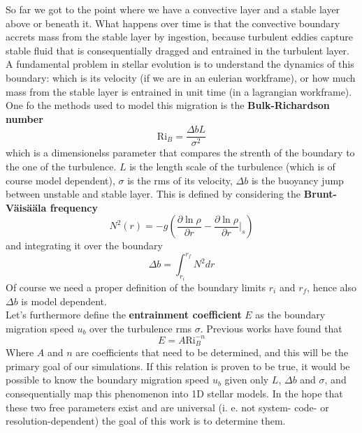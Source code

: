 \documentclass[11pt]{article}
\begin{document}
So far we got to the point where we have a convective layer and a stable layer above or beneath it. What happens over time is that the convective boundary accrets mass from the stable layer by ingestion, because turbulent eddies capture stable fluid that is consequentially dragged and entrained in the turbulent layer. A fundamental problem in stellar evolution is to understand the dynamics of this boundary: which is its velocity (if we are in an eulerian workframe), or how much mass from the stable layer is entrained in unit time (in a lagrangian workframe).\\
One fo the methods used to model this migration is the \textbf{Bulk-Richardson number}
\begin{equation}\label{bulkrichardson}
	\mathrm{Ri}_{B}=\frac{\Delta b L}{\sigma^2}
\end{equation}
which is a dimensionelss parameter that compares the strenth of the boundary to the one of the turbulence. $L$ is the length scale of the turbulence (which is of course model dependent), $\sigma$ is the rms of its velocity, $\Delta b$ is the buoyancy jump between unstable and stable layer. This is defined by considering the \textbf{Brunt-Väisääla frequency} 
\begin{equation}
	N^2(r)=-g \left (  \frac{\partial \ln \rho}{\partial r} -  \frac{\partial \ln \rho}{\partial r} \Big|_{s}  \right )
\end{equation}
and integrating it over the boundary
\begin{equation}
	\Delta b = \int_{r_i}^{r_f} N^2 dr
\end{equation}
Of course we need a proper definition of the boundary limits $r_i$ and $r_f$, hence also $\Delta b$ is model dependent. \\
Let's furthermore define the \textbf{entrainment coefficient} $E$ as the boundary migration speed $u_b$ over the turbulence rms $\sigma$. Previous works have found that
\begin{equation}
	E=A \mathrm{Ri}_{B}^{-n}
\end{equation}
Where $A$ and $n$ are coefficients that need to be determined, and this will be the primary goal of our simulations. If this relation is proven to be true, it would be possible to know the boundary migration speed $u_b$ given only $L$, $\Delta b$ and $\sigma$, and consequentially map this phenomenon into 1D stellar models. In the hope that these two free parameters exist and are universal (i. e. not system- code- or resolution-dependent) the goal of this work is to determine them.
\end{document}
